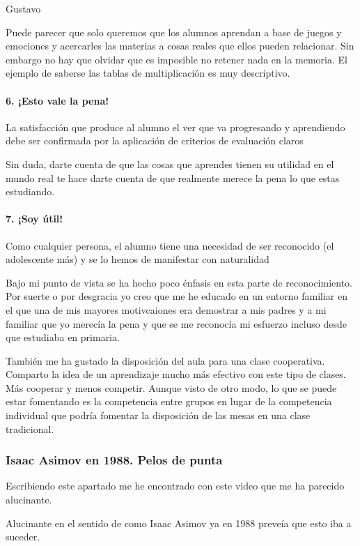 \begin{opin}{\guscolor}{Gustavo}
\begin{leftbar}{\guscolor}
Puede parecer que solo queremos que los alumnos aprendan a base de juegos y emociones y acercarles las materias a cosas reales que ellos pueden relacionar. Sin embargo no hay que olvidar que es imposible no retener nada en la memoria. El ejemplo de saberse las tablas de multiplicación es muy descriptivo.

\paragraph{6. ¡Esto vale la pena!}

La satisfacción que produce al alumno el ver que va progresando y aprendiendo debe ser confirmada por la aplicación de criterios de evaluación claros

Sin duda, darte cuenta de que las cosas que aprendes tienen su utilidad en el mundo real te hace darte cuenta de que realmente merece la pena lo que estas estudiando.

\paragraph{7. ¡Soy útil!}

Como cualquier persona, el alumno tiene una necesidad de ser reconocido (el adolescente más) y se lo hemos de manifestar con naturalidad

Bajo mi punto de vista se ha hecho poco énfasis en esta parte de reconocimiento. Por suerte o por desgracia yo creo que me he educado en un entorno familiar en el que una de mis mayores motivcaiones era demostrar a mis padres y a mi familiar que yo merecía la pena y que se me reconocía mi esfuerzo incluso desde que estudiaba en primaria. 

También me ha gustado la disposición del aula para una clase cooperativa. Comparto la idea de un aprendizaje mucho más efectivo con este tipo de clases. Más cooperar y menos competir. Aunque visto de otro modo, lo que se puede estar fomentando es la competencia entre grupos en lugar de la competencia individual que podría fomentar la disposición de las mesas en una clase tradicional.


\subsubsection{Isaac Asimov en 1988. Pelos de punta}

Escribiendo este apartado me he encontrado con este video que me ha parecido alucinante.

Alucinante en el sentido de como Isaac Asimov ya en 1988 preveía que esto iba a suceder.


\end{leftbar}
\end{opin}
